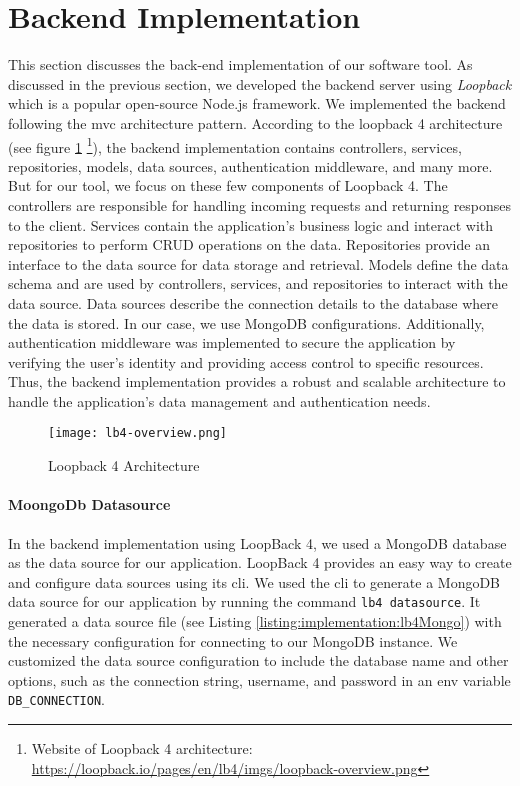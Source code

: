 \section{Backend Implementation}
\label{implementation:section:backend}
This section discusses the back-end implementation of our software tool. 
As discussed in the previous section, we developed the backend server using \textit{Loopback} which is a popular open-source Node.js framework.
We implemented the backend following the \ac{mvc} architecture pattern.
According to the loopback 4 architecture (see figure \ref{implementation:fig:loopbackarchitecture} \footnote{Website of Loopback 4 architecture: \url{https://loopback.io/pages/en/lb4/imgs/loopback-overview.png}}), the backend implementation contains controllers, services, repositories, models, data sources, authentication middleware, and many more.
But for our tool, we focus on these few components of Loopback 4. 
The controllers are responsible for handling incoming requests and returning responses to the client. 
Services contain the application's business logic and interact with repositories to perform CRUD operations on the data. 
Repositories provide an interface to the data source for data storage and retrieval. 
Models define the data schema and are used by controllers, services, and repositories to interact with the data source. 
Data sources describe the connection details to the database where the data is stored. 
In our case, we use MongoDB configurations. 
Additionally, authentication middleware was implemented to secure the application by verifying the user's identity and providing access control to specific resources.
Thus, the backend implementation provides a robust and scalable architecture to handle the application's data management and authentication needs.
\begin{figure}[ht]
    \centering
    \texttt{[image: lb4-overview.png]}
    \caption[Loopback Architecture]{Loopback 4 Architecture}
    \label{implementation:fig:loopbackarchitecture}
\end{figure}

\paragraph{MoongoDb Datasource}
In the backend implementation using LoopBack 4, we used a MongoDB database as the data source for our application. 
LoopBack 4 provides an easy way to create and configure data sources using its \ac{cli}.
We used the \ac{cli} to generate a MongoDB data source for our application by running the command \texttt{lb4 datasource}. 
It generated a data source file (see Listing \ref{listing:implementation:lb4Mongo}) with the necessary configuration for connecting to our MongoDB instance.
We customized the data source configuration to include the database name and other options, such as the connection string, username, and password in an env variable \texttt{DB\_CONNECTION}.

